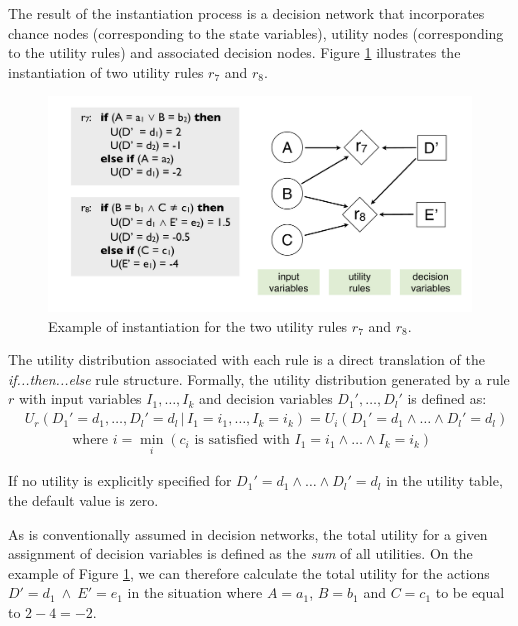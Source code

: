 The result of the instantiation process is a decision network that incorporates chance nodes (corresponding to the state variables), utility nodes (corresponding to the utility rules) and associated decision nodes. Figure \ref{fig:instantitionutil} illustrates the instantiation of two utility rules $r_7$ and $r_8$. 

\begin{figure}[ht]
\centering
\includegraphics[scale=0.25]{imgs/ruleinstantiation2.pdf}
\caption{Example of instantiation for the two utility rules $r_7$ and $r_8$.}
\label{fig:instantitionutil}
\end{figure}

The utility distribution associated with each rule is a direct translation of the  \textit{if...then...else} rule structure.  Formally, the utility distribution generated by a rule $r$ with input variables $I_1, \dots, I_k$ and decision variables $D_1', \dots, D_l'$ is defined as:
\begin{align}
& U_r(D_1'\!=\!d_1, \dots, D_l'\!=\!d_l \, | \, I_1\!=\!i_1, \dots, I_k\!=\!i_k) = U_i(D_1'\!=\!d_1 \land \dots \land D_l'\!=\!d_l) \label{eq:utildistrib}\\
&  \; \; \; \; \; \; \; \;  \; \; \; \text{ where } i = \min_i (c_i \text{ is satisfied with } I_1\!=\!i_1 \land \dots \land I_k\!=\!i_k) \nonumber
\end{align}

If no utility is explicitly specified for $D_1'\!=\!d_1 \land \dots \land D_l'\!=\!d_l$ in the utility table, the default value is zero. 

As is conventionally assumed in decision networks, the total utility for a given assignment of decision variables is defined as the \textit{sum} of all utilities.  On the example of Figure \ref{fig:instantitionutil}, we can therefore calculate the total utility for the actions $D'\!=\!d_1 \ \land \ E'\!=\!e_1$ in the situation where $A\!=\!a_1$, $B\!=\!b_1$ and $C\!=\!c_1$ to be equal to $2 - 4 = -2$. 


